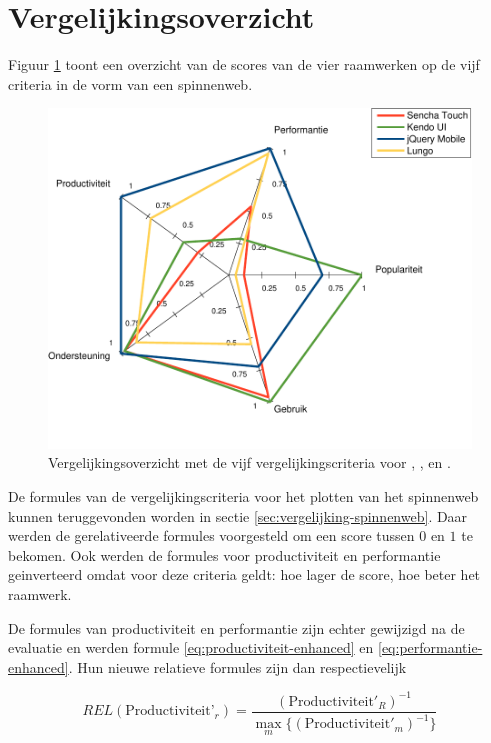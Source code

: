 \section{Vergelijkingsoverzicht}
\label{sec:evaluatie-spinnenweb}

Figuur \ref{fig:spinnenweb-final} toont een overzicht van de scores van de vier raamwerken op de vijf criteria in de vorm van een spinnenweb.

\begin{figure}[H]
  \centering
  \includegraphics[width=\textwidth]{figuren/spidergraph-final.pdf}
  \caption{Vergelijkingsoverzicht met de vijf vergelijkingscriteria voor \st{},  \kendo{},  \jqm{} en \lungo{}.}
  \label{fig:spinnenweb-final}
\end{figure}

De formules van de vergelijkingscriteria voor het plotten van het spinnenweb kunnen teruggevonden worden in sectie \ref{sec:vergelijking-spinnenweb}.
Daar werden de gerelativeerde formules voorgesteld om een score tussen $0$ en $1$ te bekomen.
Ook werden de formules voor productiviteit en performantie geinverteerd omdat voor deze criteria geldt:  hoe lager de score, hoe beter het raamwerk.

De formules van productiviteit en performantie zijn echter gewijzigd na de evaluatie en werden formule \ref{eq:productiviteit-enhanced} en \ref{eq:performantie-enhanced}.
Hun nieuwe relatieve formules zijn dan respectievelijk

\begin{equation}
  REL(\text{Productiviteit'}_r) = \frac{\left(\text{Productiviteit}'_R\right)^{-1}}{\max_{m}\{\left(\text{Productiviteit}'_m\right)^{-1}\}}
  \label{eq:rel-productiviteit-final}
\end{equation}

